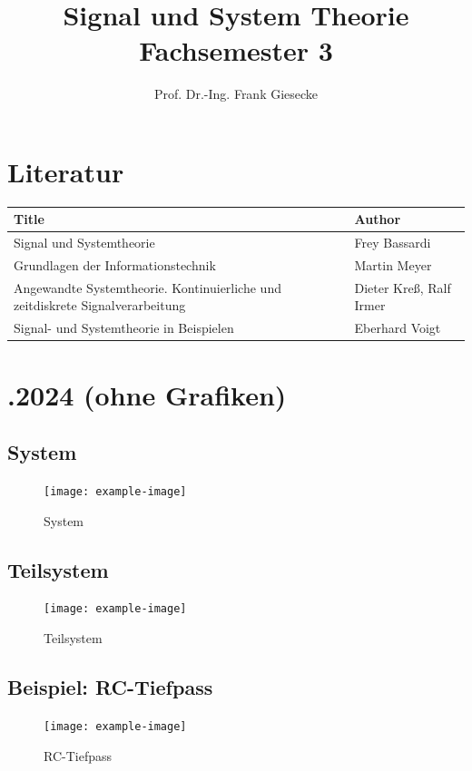 \documentclass{article}
\title{Signal und System Theorie  \\ [1ex] \large Fachsemester 3}
\author{Prof. Dr.-Ing. Frank Giesecke}
\date{}
\begin{document}
\maketitle

\newpage
\tableofcontents

\newpage
\section{\centering Literatur}
\begin{table}[!ht]
	\centering
	\begin{tabular}{|l|l|}
		\hline
		Title & Author \\
		\hline\hline
		Signal und Systemtheorie & Frey Bassardi \\
		\hline
		Grundlagen der Informationstechnik & Martin Meyer \\
		\hline
		Angewandte Systemtheorie. Kontinuierliche und zeitdiskrete Signalverarbeitung & Dieter Kreß, Ralf Irmer \\
		\hline
		Signal- und Systemtheorie in Beispielen & Eberhard Voigt \\
		\hline
	\end{tabular}
\end{table}


\newpage
\section{.2024 (ohne Grafiken)}
\subsection{System}
\begin{figure}[!ht]
	\centering
	\texttt{[image: example-image]}
	\caption{System}\label{Abb. System}
\end{figure}

\subsection{Teilsystem}
\begin{figure}[!ht]
	\centering
	\texttt{[image: example-image]}
	\caption{Teilsystem}\label{Abb. Teilsystem}
\end{figure}

\subsection{Beispiel: RC-Tiefpass}
\begin{figure}[!ht]
	\centering
	\texttt{[image: example-image]}
	\caption{RC-Tiefpass}\label{Abb. RC-Tiefpass}
\end{figure}
\end{document}

